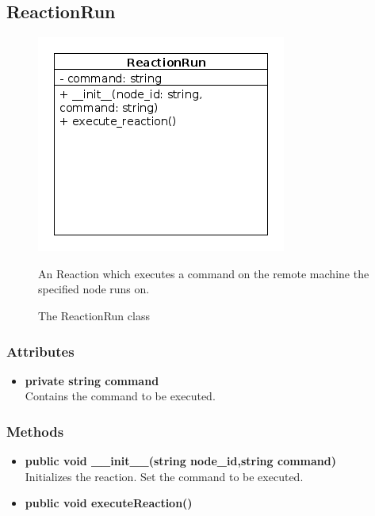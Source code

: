 \newpage
\subsection{ReactionRun}
\begin{figure}[htbp]
	\begin{minipage}[t]{8cm}
		\vspace{0pt}
		\centering
		\includegraphics[scale=0.6]{./diagram_pictures/reactor/ReactionRun.png}
		\caption{The ReactionRun class}
	\end{minipage}
	\hfill
	\begin{minipage}[t]{8cm}
		\vspace{10pt}
			An Reaction which executes a command on the remote machine the specified node runs on. 
	\end{minipage}
\end{figure}

\subsubsection{Attributes}
\begin{itemize}
	\item \textbf{ private string command }\\
	Contains the command to be executed.
\end{itemize}
\subsubsection{Methods}
\begin{itemize}
	\item \textbf{ public void \_\_init\_\_(string node\_id,string command) }\\
		Initializes the reaction. Set the command to be executed.
	\item \textbf{ public void executeReaction() }\\
\end{itemize}


